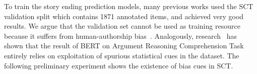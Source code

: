 
To train the story ending prediction models, many previous works
used the SCT validation split which contains 1871 annotated items,
and achieved very good results.
We argue that the validation set cannot be used as training resource because
it suffers from human-authorship bias~\cite{sharma2018tackling}. 
Analogously, research~\cite{niven2019probing}
has shown that the result of BERT on Argument Reasoning
Comprehension Task~\cite{habernal2017argument} entirely
relies on exploitation of spurious statistical cues in the dataset. 
The following preliminary experiment shows the existence of bias cues in SCT. 

